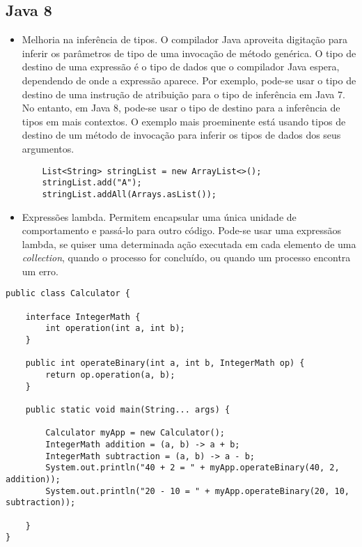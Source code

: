 	\subsection{Java 8}
	  \begin{itemize}
		  \item Melhoria na inferência de tipos. O compilador Java aproveita digitação para inferir os parâmetros de tipo de uma invocação de método genérica. O tipo de destino de uma expressão é o tipo de dados que o compilador Java espera, dependendo de onde a expressão aparece. Por exemplo, pode-se usar o tipo de destino de uma instrução de atribuição para o tipo de inferência em Java 7. No entanto, em Java 8, pode-se usar o tipo de destino para a inferência de tipos em mais contextos. O exemplo mais proeminente está usando tipos de destino de um método de invocação para inferir os tipos de dados dos seus argumentos.

\begin{lstlisting}
	List<String> stringList = new ArrayList<>();
	stringList.add("A");
	stringList.addAll(Arrays.asList());
\end{lstlisting}
		  
		  
		  \item Expressões lambda. Permitem encapsular uma única unidade de comportamento e passá-lo para outro código. Pode-se usar uma expressãos lambda, se quiser uma determinada ação executada em cada elemento de uma {\it collection}, quando o processo for concluído, ou quando um processo encontra um erro. \cite{JSE7} \\
	  \end{itemize}

\clearpage
\begin{lstlisting}
public class Calculator {
	
	interface IntegerMath {
		int operation(int a, int b);   
	}

	public int operateBinary(int a, int b, IntegerMath op) {
		return op.operation(a, b);
	}

	public static void main(String... args) {

		Calculator myApp = new Calculator();
		IntegerMath addition = (a, b) -> a + b;
		IntegerMath subtraction = (a, b) -> a - b;
		System.out.println("40 + 2 = " + myApp.operateBinary(40, 2, addition));
		System.out.println("20 - 10 = " + myApp.operateBinary(20, 10, subtraction));    
		
	}
}
\end{lstlisting}
